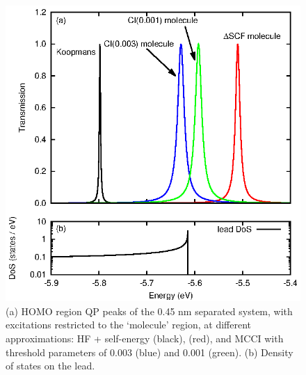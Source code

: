 \begin{figure}
	\begin{center}
		\includegraphics[width=0.9\linewidth]{figures/figure4a_4b}
	\end{center}
	\caption{(a) HOMO region \ac{QP} peaks of the 0.45 nm separated
	         system, with excitations restricted to the `molecule' region,
		 at different approximations: HF + self-energy (black),
		 \dscf (red), and MCCI with threshold parameters of
		 0.003 (blue) and 0.001 (green). (b) Density of states on the
		 lead.}
	\label{fig:all45Ahomo}
\end{figure}

